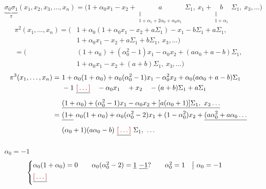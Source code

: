 \documentclass[11pt,a4paper]{article}
\begin{document}
\[
\underbrace{\sigma_0\sigma_1}_{\pi}(x_1, x_2, x_3, \dots, x_n) = \bigl(1 + \alpha_0 x_1 - x_2 + \underset{\substack{\| \\ 1+\alpha_1+2\alpha_0+\alpha_0\alpha_1}}{a}\,\Sigma_1,\ x_1 + \underset{\substack{\| \\ 1+\alpha_1}}{b}\,\Sigma_1,\ x_3, \dots\bigr)
\]
\[
\begin{aligned}
\pi^2(x_1, \dots, x_n) = \bigl(&1 + \alpha_0(1 + \alpha_0 x_1 - x_2 + a\Sigma_1) - x_1 - b\Sigma_1 + a\Sigma_1,\\
&1 + \alpha_0 x_1 - x_2 + a\Sigma_1 + b\Sigma_1,\ x_3, \dots\bigr)\\
= \bigl(&(1+\alpha_0) + (\alpha_0^2 - 1)x_1 - \alpha_0 x_2 + (a\alpha_0 + a - b)\Sigma_1,\\
&1 + \alpha_0 x_1 - x_2 + (a+b)\Sigma_1,\ x_3, \dots\bigr)
\end{aligned}
\]
\[
\begin{aligned}
\pi^3(x_1, \dots, x_n) = \ &1 + \alpha_0(1+\alpha_0) + \alpha_0(\alpha_0^2 - 1)x_1 - \alpha_0^2 x_2 + \alpha_0(a\alpha_0 + a - b)\Sigma_1\\
&-1\ \struck{\ill{}}\quad - \alpha_0 x_1 \quad + x_2 \quad - (a+b)\Sigma_1 + a\Sigma_1\\
&\uncertain{(1+\alpha_0) + (\alpha_0^2-1)x_1 - \alpha_0 x_2 + [a(\alpha_0 + 1)]\Sigma_1,\ x_3 \ldots}\\
= \ &\struck{(1+}\ \alpha_0(1+\alpha_0) + \alpha_0(\alpha_0^2 - 2)x_1 + (1 - \alpha_0^2)x_2 + \struck{(a\alpha_0^2 + a\alpha_0 \ldots}\\
&(\alpha_0+1)(a\alpha_0 - b)\ \struck{\ill{}}\ \Sigma_1,\ \ldots
\end{aligned}
\]

$\alpha_0 = -1$
\[
\begin{cases}
\alpha_0(1 + \alpha_0) = 0 \qquad \alpha_0(\alpha_0^2 - 2) = \struck{1}\ \uncertain{-1}? \qquad \alpha_0^2 = 1 \quad \big|\ \alpha_0 = -1\\
\struck{\ill{}}
\end{cases}
\]

\end{document}
